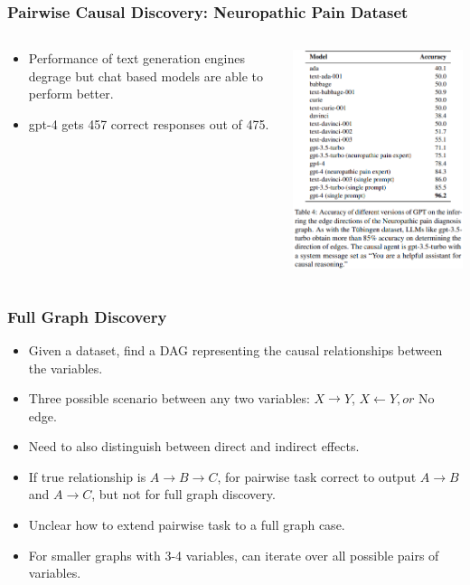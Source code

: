\documentclass{beamer}
\begin{document}
\begin{frame}
	\frametitle{Pairwise Causal Discovery: Neuropathic Pain Dataset}
	\begin{columns}
		\begin{column}{0.5 \textwidth}
			\begin{itemize}
				\item Performance of text generation engines degrage but chat based models are able to perform better.
				\item gpt-4 gets 457 correct responses out of 475.
			\end{itemize}
		\end{column}
		\begin{column}{0.5 \textwidth}
			\includegraphics[scale=0.4]{imgs/table4.png}
		\end{column}
	\end{columns}
\end{frame}

\begin{frame}
	\frametitle{Full Graph Discovery}
	\begin{itemize}
		\item Given a dataset, find a DAG representing the causal relationships between the variables.
		\item Three possible scenario between any two variables: $ X \rightarrow Y $, $ X \leftarrow Y, or $ No edge.
		\item Need to also distinguish between direct and indirect effects.
		\item If true relationship is $ A \rightarrow B \rightarrow C $, for pairwise task correct to output $ A \rightarrow B $
			and $ A \rightarrow C $, but not for full graph discovery.
		\item Unclear how to extend pairwise task to a full graph case.
		\item For smaller graphs with 3-4 variables, can iterate over all possible pairs of variables.
	\end{itemize}
\end{frame}
\end{document}
